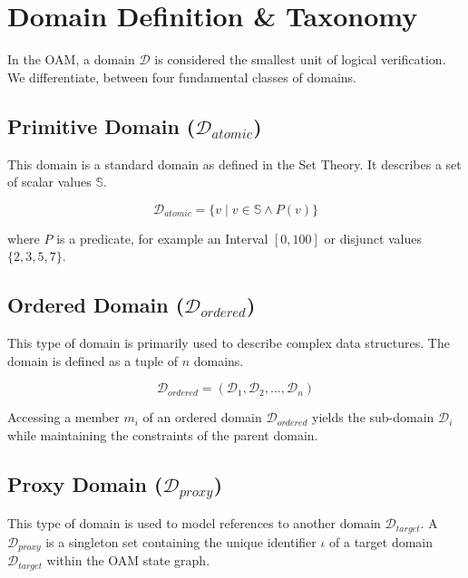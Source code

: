 \documentclass{article}
\begin{document}
    \section{Domain Definition \& Taxonomy}

    In the OAM, a domain $\mathcal{D}$ is considered the smallest unit of logical verification. We differentiate, between four fundamental classes of domains.

    \subsection{Primitive Domain ($\mathcal{D}_{atomic}$)}

    This domain is a standard domain as defined in the Set Theory. It describes a set of scalar values $\mathbb{S}$.

    \begin{equation}
        \mathcal{D}_{atomic}=\{v \mid v \in \mathbb{S} \land P(v)\}
    \end{equation}

    where $P$ is a predicate, for example an Interval $[0, 100]$ or disjunct values $\{2, 3, 5, 7\}$.

    \subsection{Ordered Domain ($\mathcal{D}_{ordered}$)}

    This type of domain is primarily used to describe complex data structures. The domain is defined as a tuple of $n$ domains.

    \begin{equation}
        \mathcal{D}_{ordered}=(\mathcal{D}_1,\mathcal{D}_2,...,\mathcal{D}_n)
    \end{equation}

    Accessing a member $m_i$ of an ordered domain $\mathcal{D}_{ordered}$ yields the sub-domain $\mathcal{D}_i$ while maintaining the constraints of the parent domain.

    \subsection{Proxy Domain ($\mathcal{D}_{proxy}$)}

    This type of domain is used to model references to another domain $\mathcal{D}_{target}$. A $\mathcal{D}_{proxy}$ is a singleton set containing the unique identifier $\iota$ of a target domain $\mathcal{D}_{target}$ within the OAM state graph.
\end{document}
